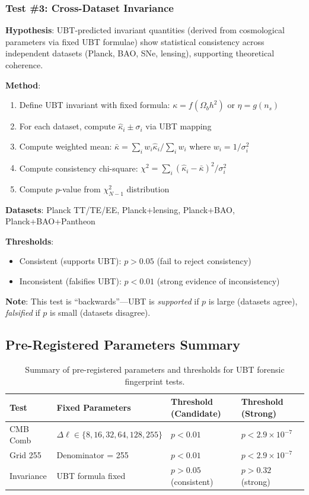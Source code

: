 \subsubsection{Test \#3: Cross-Dataset Invariance}

\textbf{Hypothesis}: UBT-predicted invariant quantities (derived from cosmological parameters via fixed UBT formulae) show statistical consistency across independent datasets (Planck, BAO, SNe, lensing), supporting theoretical coherence.

\textbf{Method}:
\begin{enumerate}
    \item Define UBT invariant with fixed formula: $\kappa = f(\Omega_b h^2)$ or $\eta = g(n_s)$
    \item For each dataset, compute $\hat{\kappa}_i \pm \sigma_i$ via UBT mapping
    \item Compute weighted mean: $\bar{\kappa} = \sum_i w_i \hat{\kappa}_i / \sum_i w_i$ where $w_i = 1/\sigma_i^2$
    \item Compute consistency chi-square: $\chi^2 = \sum_i (\hat{\kappa}_i - \bar{\kappa})^2 / \sigma_i^2$
    \item Compute $p$-value from $\chi^2_{N-1}$ distribution
\end{enumerate}

\textbf{Datasets}: Planck TT/TE/EE, Planck+lensing, Planck+BAO, Planck+BAO+Pantheon

\textbf{Thresholds}:
\begin{itemize}
    \item Consistent (supports UBT): $p > 0.05$ (fail to reject consistency)
    \item Inconsistent (falsifies UBT): $p < 0.01$ (strong evidence of inconsistency)
\end{itemize}

\textbf{Note}: This test is ``backwards''—UBT is \textit{supported} if $p$ is large (datasets agree), \textit{falsified} if $p$ is small (datasets disagree).

\subsection{Pre-Registered Parameters Summary}

\begin{table}[h]
\centering
\begin{tabular}{llll}
\hline
\textbf{Test} & \textbf{Fixed Parameters} & \textbf{Threshold (Candidate)} & \textbf{Threshold (Strong)} \\
\hline
CMB Comb & $\Delta\ell \in \{8,16,32,64,128,255\}$ & $p < 0.01$ & $p < 2.9 \times 10^{-7}$ \\
Grid 255 & Denominator = 255 & $p < 0.01$ & $p < 2.9 \times 10^{-7}$ \\
Invariance & UBT formula fixed & $p > 0.05$ (consistent) & $p > 0.32$ (strong) \\
\hline
\end{tabular}
\caption{Summary of pre-registered parameters and thresholds for UBT forensic fingerprint tests.}
\end{table}

